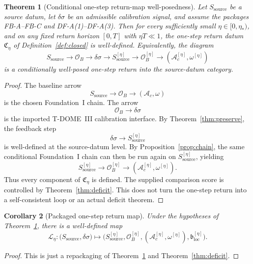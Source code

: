 \documentclass[12pt]{article}
\newtheorem{theorem}{Theorem}[section]
\newtheorem{corollary}[theorem]{Corollary}
\theoremstyle{definition}
\theoremstyle{remark}
\begin{document}
\begin{theorem}[Conditional one-step return-map well-posedness]\label{thm:closed}
Let \(S_{\mathrm{source}}\) be a source datum, let
\(\delta\sigma\) be an admissible calibration signal, and assume the
packages FB-A--FB-C and DF-A(1)--DF-A(3). Then for every sufficiently
small \(\eta\in[0,\eta_*)\), and on any fixed return horizon \([0,T]\)
with \(\eta T\ll1\), the one-step return datum
\(\mathfrak C_\eta\) of Definition~\ref{def:closed} is well-defined.
Equivalently, the diagram
\[
S_{\mathrm{source}}
\longrightarrow
 \mathcal O_B
\longrightarrow
\delta\sigma
\longrightarrow
S_{\mathrm{source}}^{[\eta]}
\longrightarrow
 \mathcal O_B^{[\eta]}
 \longrightarrow
 (\mathcal A_c^{[\eta]},\omega^{[\eta]})
\]
is a conditionally well-posed one-step return into the source-datum
category.
\end{theorem}

\begin{proof}
The baseline arrow
\[
S_{\mathrm{source}}\to \mathcal O_B \to (\mathcal A_c,\omega)
\]
is the chosen Foundation~I chain. The arrow
\[
\mathcal O_B \to\delta\sigma
\]
is the imported T-DOME~III calibration interface. By
Theorem~\ref{thm:preserve}, the feedback step
\[
\delta\sigma \to S_{\mathrm{source}}^{[\eta]}
\]
is well-defined at the source-datum level. By
Proposition~\ref{prop:chain}, the same conditional Foundation~I chain
can then be run again on \(S_{\mathrm{source}}^{[\eta]}\), yielding
\[
S_{\mathrm{source}}^{[\eta]}
\to
\mathcal O_B^{[\eta]}
\to
(\mathcal A_c^{[\eta]},\omega^{[\eta]}).
\]
Thus every component of \(\mathfrak C_\eta\) is defined. The supplied
comparison score is controlled by Theorem~\ref{thm:deficit}. This does
not turn the one-step return into a self-consistent loop or an actual
deficit theorem.
\end{proof}

\begin{corollary}[Packaged one-step return map]
\label{cor:map}
Under the hypotheses of Theorem~\ref{thm:closed}, there is a well-defined
map
\[
\mathscr L_\eta:
\bigl(S_{\mathrm{source}},\delta\sigma\bigr)
\longmapsto
\bigl(
S_{\mathrm{source}}^{[\eta]},
\mathcal O_B^{[\eta]},
(\mathcal A_c^{[\eta]},\omega^{[\eta]}),
\mathfrak b_{\mathrm{loc}}^{[\eta]}
\bigr).
\]
\end{corollary}

\begin{proof}
This is just a repackaging of Theorem~\ref{thm:closed} and
Theorem~\ref{thm:deficit}.
\end{proof}
\end{document}
